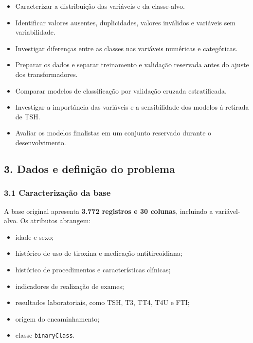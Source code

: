 \documentclass[
]{article}
\providecommand{\tightlist}{%
  \setlength{\itemsep}{0pt}\setlength{\parskip}{0pt}}
\begin{document}
\begin{itemize}
\tightlist
\item
  Caracterizar a distribuição das variáveis e da classe-alvo.
\item
  Identificar valores ausentes, duplicidades, valores inválidos e
  variáveis sem variabilidade.
\item
  Investigar diferenças entre as classes nas variáveis numéricas e
  categóricas.
\item
  Preparar os dados e separar treinamento e validação reservada antes do
  ajuste dos transformadores.
\item
  Comparar modelos de classificação por validação cruzada estratificada.
\item
  Investigar a importância das variáveis e a sensibilidade dos modelos à
  retirada de TSH.
\item
  Avaliar os modelos finalistas em um conjunto reservado durante o
  desenvolvimento.
\end{itemize}

\hypertarget{dados-e-definiuxe7uxe3o-do-problema}{%
\subsection{3. Dados e definição do
problema}\label{dados-e-definiuxe7uxe3o-do-problema}}

\hypertarget{caracterizauxe7uxe3o-da-base}{%
\subsubsection{3.1 Caracterização da
base}\label{caracterizauxe7uxe3o-da-base}}

A base original apresenta \textbf{3.772 registros e 30 colunas},
incluindo a variável-alvo. Os atributos abrangem:

\begin{itemize}
\tightlist
\item
  idade e sexo;
\item
  histórico de uso de tiroxina e medicação antitireoidiana;
\item
  histórico de procedimentos e características clínicas;
\item
  indicadores de realização de exames;
\item
  resultados laboratoriais, como TSH, T3, TT4, T4U e FTI;
\item
  origem do encaminhamento;
\item
  classe \texttt{binaryClass}.
\end{itemize}
\end{document}
